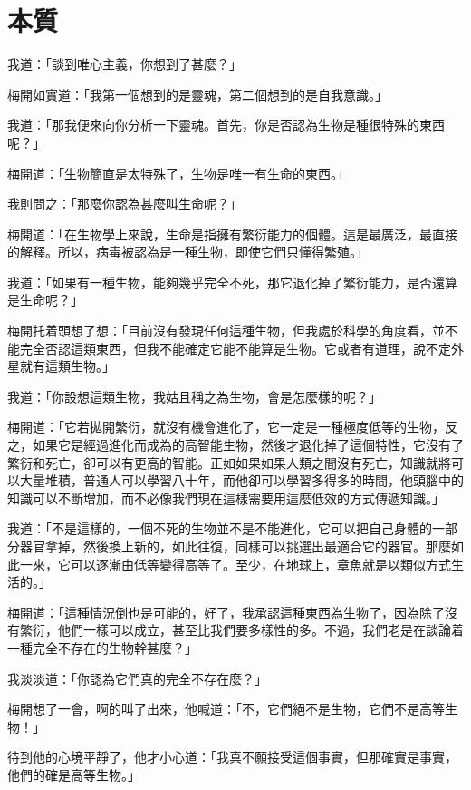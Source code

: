 \chapter{本質}

我道：「談到唯心主義，你想到了甚麼？」

梅開如實道：「我第一個想到的是靈魂，第二個想到的是自我意識。」

我道：「那我便來向你分析一下靈魂。首先，你是否認為生物是種很特殊的東西呢？」

梅開道：「生物簡直是太特殊了，生物是唯一有生命的東西。」

我則問之：「那麼你認為甚麼叫生命呢？」

梅開道：「在生物學上來說，生命是指擁有繁衍能力的個體。這是最廣泛，最直接的解釋。所以，病毒被認為是一種生物，即使它們只懂得繁殖。」

我道：「如果有一種生物，能夠幾乎完全不死，那它退化掉了繁衍能力，是否還算是生命呢？」

梅開托着頭想了想：「目前沒有發現任何這種生物，但我處於科學的角度看，並不能完全否認這類東西，但我不能確定它能不能算是生物。它或者有道理，說不定外星就有這類生物。」

我道：「你設想這類生物，我姑且稱之為生物，會是怎麼樣的呢？」

梅開道：「它若拋開繁衍，就沒有機會進化了，它一定是一種極度低等的生物，反之，如果它是經過進化而成為的高智能生物，然後才退化掉了這個特性，它沒有了繁衍和死亡，卻可以有更高的智能。正如如果如果人類之間沒有死亡，知識就將可以大量堆積，普通人可以學習八十年，而他卻可以學習多得多的時間，他頭腦中的知識可以不斷增加，而不必像我們現在這樣需要用這麼低效的方式傳遞知識。」

我道：「不是這樣的，一個不死的生物並不是不能進化，它可以把自己身體的一部分器官拿掉，然後換上新的，如此往復，同樣可以挑選出最適合它的器官。那麼如此一來，它可以逐漸由低等變得高等了。至少，在地球上，章魚就是以類似方式生活的。」

梅開道：「這種情況倒也是可能的，好了，我承認這種東西為生物了，因為除了沒有繁衍，他們一樣可以成立，甚至比我們要多樣性的多。不過，我們老是在談論着一種完全不存在的生物幹甚麼？」

我淡淡道：「你認為它們真的完全不存在麼？」

梅開想了一會，啊的叫了出來，他喊道：「不，它們絕不是生物，它們不是高等生物！」

待到他的心境平靜了，他才小心道：「我真不願接受這個事實，但那確實是事實，他們的確是高等生物。」

